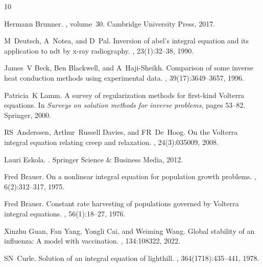 \documentclass[12pt,a4paper]{article}
\begin{document}
%
%

\begin{thebibliography}{10}
	
	Hermann Brunner.
	, volume~30.
	\newblock Cambridge University Press, 2017.
	
	M~Deutsch, A~Notea, and D~Pal.
	\newblock Inversion of abel's integral equation and its application to ndt by
	x-ray radiography.
	, 23(1):32--38, 1990.
	
	James~V Beck, Ben Blackwell, and A~Haji-Sheikh.
	\newblock Comparison of some inverse heat conduction methods using experimental
	data.
	,
	39(17):3649--3657, 1996.
	
	Patricia~K Lamm.
	\newblock A survey of regularization methods for first-kind {V}olterra
	equations.
	\newblock In {\em Surveys on solution methods for inverse problems}, pages
	53--82. Springer, 2000.
	
	RS~Anderssen, Arthur~Russell Davies, and FR~De~Hoog.
	\newblock On the {V}olterra integral equation relating creep and relaxation.
	, 24(3):035009, 2008.
	
	Lauri Eskola.
	.
	\newblock Springer Science \& Business Media, 2012.
	
	Fred Brauer.
	\newblock On a nonlinear integral equation for population growth problems.
	, 6(2):312--317, 1975.
	
	Fred Brauer.
	\newblock Constant rate harvesting of populations governed by {V}olterra
	integral equations.
	,
	56(1):18--27, 1976.
	
	Xinzhu Guan, Fan Yang, Yongli Cai, and Weiming Wang.
	\newblock Global stability of an influenza: A model with vaccination.
	, 134:108322, 2022.
	
	SN~Curle.
	\newblock Solution of an integral equation of lighthill.
	, 364(1718):435--441, 1978.
	

\end{thebibliography}
\end{document}
